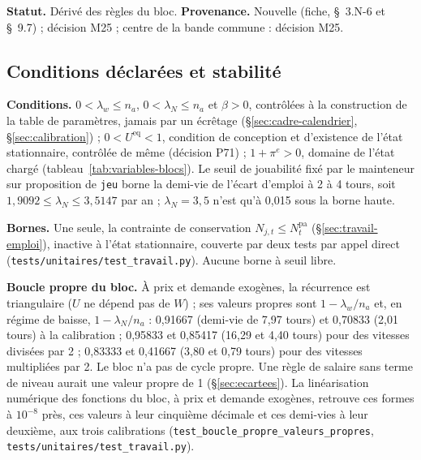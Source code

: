 \documentclass[11pt,a4paper]{article}
\begin{document}
\textbf{Statut.} Dérivé des règles du bloc. \textbf{Provenance.} Nouvelle (fiche, \S~3.N-6 et \S~9.7) ; décision M25 ; centre de la bande commune : décision M25.

\subsection{Conditions déclarées et stabilité}
\label{sec:travail-conditions}
\textbf{Conditions.} $0 < \lambda_w \le n_a$, $0 < \lambda_N \le n_a$ et $\beta > 0$, contrôlées à la construction de la table de paramètres, jamais par un écrêtage (\S\ref{sec:cadre-calendrier}, \S\ref{sec:calibration}) ; $0 < U^{\mathrm{eq}} < 1$, condition de conception et d'existence de l'état stationnaire, contrôlée de même (décision P71) ; $1 + \pi^e > 0$, domaine de l'état chargé (tableau~\ref{tab:variables-blocs}). Le seuil de jouabilité fixé par le mainteneur sur proposition de \texttt{jeu} borne la demi-vie de l'écart d'emploi à 2 à 4 tours, soit $1{,}9092 \le \lambda_N \le 3{,}5147$ par an ; $\lambda_N = 3{,}5$ n'est qu'à 0,015 sous la borne haute.

\textbf{Bornes.} Une seule, la contrainte de conservation $N_{j,t} \le N^{\mathrm{pa}}_t$ (\S\ref{sec:travail-emploi}), inactive à l'état stationnaire, couverte par deux tests par appel direct (\nolinkurl{tests/unitaires/test_travail.py}). Aucune borne à seuil libre.

\textbf{Boucle propre du bloc.} À prix et demande exogènes, la récurrence est triangulaire ($U$ ne dépend pas de $W$) ; ses valeurs propres sont $1 - \lambda_w/n_a$ et, en régime de baisse, $1 - \lambda_N/n_a$ : 0,91667 (demi-vie de 7,97 tours) et 0,70833 (2,01 tours) à la calibration ; 0,95833 et 0,85417 (16,29 et 4,40 tours) pour des vitesses divisées par 2 ; 0,83333 et 0,41667 (3,80 et 0,79 tours) pour des vitesses multipliées par 2. Le bloc n'a pas de cycle propre. Une règle de salaire sans terme de niveau aurait une valeur propre de 1 (\S\ref{sec:ecartees}). La linéarisation numérique des fonctions du bloc, à prix et demande exogènes, retrouve ces formes à $10^{-8}$ près, ces valeurs à leur cinquième décimale et ces demi-vies à leur deuxième, aux trois calibrations (\nolinkurl{test_boucle_propre_valeurs_propres}, \nolinkurl{tests/unitaires/test_travail.py}).
\end{document}
